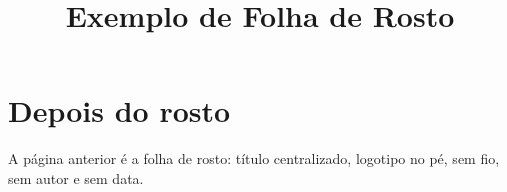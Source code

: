 \documentclass[externo]{crpsp-relatorio}
\title{Exemplo de Folha de Rosto}
\begin{document}
\relCapa

\section{Depois do rosto}

A página anterior é a folha de rosto: título centralizado, logotipo no
pé, sem fio, sem autor e sem data.
\end{document}
